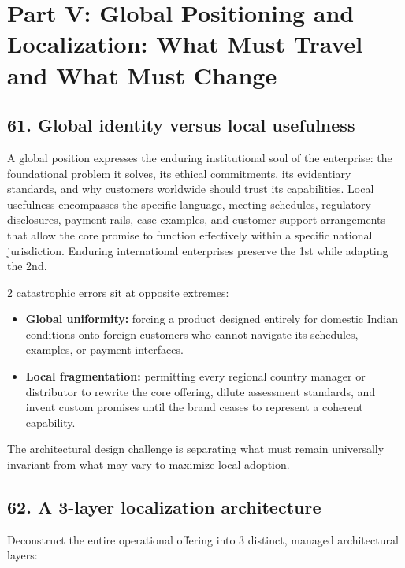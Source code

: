 \section{Part V: Global Positioning and Localization: What Must Travel and What Must Change}

\subsection{61. Global identity versus local usefulness}

A global position expresses the enduring institutional soul of the enterprise: the foundational problem it solves, its ethical commitments, its evidentiary standards, and why customers worldwide should trust its capabilities. Local usefulness encompasses the specific language, meeting schedules, regulatory disclosures, payment rails, case examples, and customer support arrangements that allow the core promise to function effectively within a specific national jurisdiction. Enduring international enterprises preserve the 1st while adapting the 2nd.

2 catastrophic errors sit at opposite extremes:
\begin{itemize}
    \item \textbf{Global uniformity:} forcing a product designed entirely for domestic Indian conditions onto foreign customers who cannot navigate its schedules, examples, or payment interfaces.
    \item \textbf{Local fragmentation:} permitting every regional country manager or distributor to rewrite the core offering, dilute assessment standards, and invent custom promises until the brand ceases to represent a coherent capability.
\end{itemize}
The architectural design challenge is separating what must remain universally invariant from what may vary to maximize local adoption.

\subsection{62. A 3-layer localization architecture}

Deconstruct the entire operational offering into 3 distinct, managed architectural layers:

